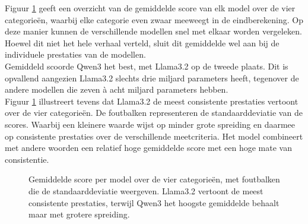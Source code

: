 Figuur \ref{fig:gemiddelde_score_per_model_met_sd} geeft een overzicht van de gemiddelde score van elk model over de vier categorieën, waarbij elke categorie even zwaar meeweegt in de eindberekening. Op deze manier kunnen de verschillende modellen snel met elkaar worden vergeleken. Hoewel dit niet het hele verhaal verteld, sluit dit gemiddelde wel aan bij de individuele prestaties van de modellen.
\\[1em]
Gemiddeld scoorde Qwen3 het best, met Llama3.2 op de tweede plaats. Dit is opvallend aangezien Llama3.2 slechts drie miljard parameters heeft, tegenover de andere modellen die zeven à acht miljard parameters hebben.
\\[1em]
Figuur \ref{fig:gemiddelde_score_per_model_met_sd} illustreert tevens dat Llama3.2 de meest consistente prestaties vertoont over de vier categorieën. De foutbalken representeren de standaarddeviatie van de scores. Waarbij een kleinere waarde wijst op minder grote spreiding en daarmee op consistente prestaties over de verschillende meetcriteria. Het model combineert met andere woorden een relatief hoge gemiddelde score met een hoge mate van consistentie.

\begin{figure}[H]
    \centering
    \caption{Gemiddelde score per model over de vier categorieën, met foutbalken die de standaarddeviatie weergeven. Llama3.2 vertoont de meest consistente prestaties, terwijl Qwen3 het hoogste gemiddelde behaalt maar met grotere spreiding.}
    \label{fig:gemiddelde_score_per_model_met_sd}
\end{figure}

